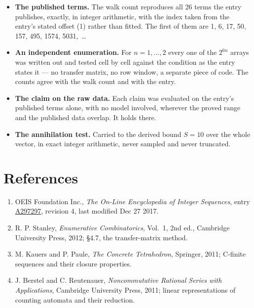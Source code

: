 \documentclass[11pt]{article}
\theoremstyle{definition}
\begin{document}
\begin{itemize}

\item {\bfseries The published terms.} The walk count reproduces all 26 terms the entry publishes, exactly, in integer arithmetic, with the index taken from the entry's stated offset (1) rather than fitted. The first of them are 1, 6, 17, 50, 157, 495, 1574, 5031,~\dots

\item {\bfseries An independent enumeration.} For $n = 1,\dots,2$ every one of the $2^{6n}$ arrays was written out and tested cell by cell against the condition as the entry states it --- no transfer matrix, no row window, a separate piece of code. The counts agree with the walk count and with the entry.

\item {\bfseries The claim on the raw data.} Each claim was evaluated on the entry's published terms alone, with no model involved, wherever the proved range and the published data overlap. It holds there.

\item {\bfseries The annihilation test.} Carried to the derived bound $S = 10$ over the whole vector, in exact integer arithmetic, never sampled and never truncated.

\end{itemize}

\section{References}

\begin{enumerate}

\item OEIS Foundation Inc., \emph{The On-Line Encyclopedia of Integer Sequences}, entry \href{https://oeis.org/A297297}{A297297}, revision 4, last modified Dec 27 2017.

\item R. P. Stanley, \emph{Enumerative Combinatorics}, Vol.~1, 2nd ed., Cambridge University Press, 2012; \S4.7, the transfer-matrix method.

\item M. Kauers and P. Paule, \emph{The Concrete Tetrahedron}, Springer, 2011; C-finite sequences and their closure properties.

\item J. Berstel and C. Reutenauer, \emph{Noncommutative Rational Series with Applications}, Cambridge University Press, 2011; linear representations of counting automata and their reduction.

\end{enumerate}
\end{document}
